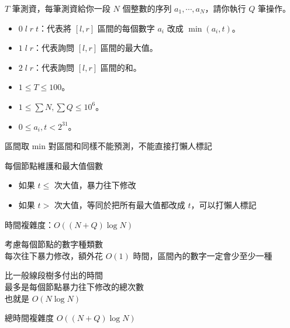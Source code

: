 \begin{frame}{}
    \begin{problem}
        $T$ 筆測資，每筆測資給你一段 $N$ 個整數的序列 $a_1,\cdots,a_N$，請你執行 $Q$ 筆操作。

        \begin{itemize}
            \item $0\;l\;r\;t$：代表將 $[l,r]$ 區間的每個數字 $a_i$ 改成 $\min(a_i,t)$。
            \item $1\;l\;r$：代表詢問 $[l,r]$ 區間的最大值。
            \item $2\;l\;r$：代表詢問 $[l,r]$ 區間的和。
        \end{itemize}
        
        \begin{itemize}
            \item $1\le T\le 100$。
            \item $1\le \sum N,\sum Q\le 10^6$。
            \item $0\le a_i,t< 2^{31}$。
        \end{itemize}
    \end{problem}

    區間取 min 對區間和同樣不能預測，不能直接打懶人標記
\end{frame}

\begin{frame}{}
    每個節點維護和最大值個數

     {
        \begin{itemize}
            \item 如果 $t \leq$ 次大值，暴力往下修改
            \item 如果 $t >$ 次大值，等同於把所有最大值都改成 $t$，可以打懶人標記
        \end{itemize}

        時間複雜度：$O((N + Q) \log N)$
    }
\end{frame}

\begin{frame}{}
    考慮每個節點的數字種類數 \\
    每次往下暴力修改，額外花 $O(1)$ 時間，區間內的數字一定會少至少一種

    比一般線段樹多付出的時間 \\
    最多是每個節點暴力往下修改的總次數 \\
    也就是 $O(N \log N)$

     {
        總時間複雜度 $O((N + Q) \log N)$
    }
\end{frame}

